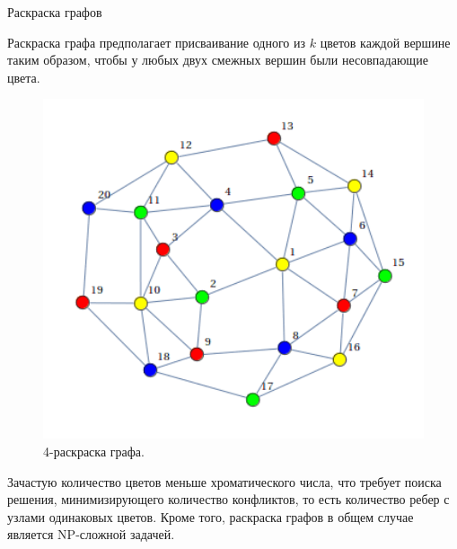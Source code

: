\documentclass{beamer}
\begin{document}
\begin{frame}{Раскраска графов}
    \small

    \begin{minipage}{0.49\textwidth}
        Раскраска графа предполагает присваивание одного из $k$ цветов каждой вершине таким образом, чтобы у любых двух смежных вершин были несовпадающие цвета.
    \end{minipage}
    \begin{minipage}{0.49\textwidth}
        \begin{figure}
            \centering
            \includegraphics[width=1.0\textwidth]{images/graph_coloring.png}
            \caption{4-раскраска графа.}
        \end{figure}
    \end{minipage}

    Зачастую количество цветов меньше хроматического числа, что требует поиска решения, минимизирующего количество конфликтов, то есть количество ребер с узлами одинаковых цветов.
    Кроме того, раскраска графов в общем случае является NP-сложной задачей.
\end{frame}
\end{document}
